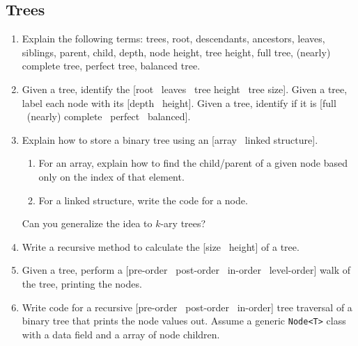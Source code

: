 \documentclass[10pt]{article}
\begin{document}
\subsection{Trees}
\begin{enumerate}[leftmargin=0em]\addtocounter{enumi}{25}
\item Explain the following terms: trees, root, descendants, ancestors, leaves, siblings, parent, child, depth, node height, tree height, full tree, (nearly) complete tree, perfect tree, balanced tree.
\item Given a tree, identify the [root \vline\ leaves \vline\ tree height \vline\ tree size]. Given a tree, label each node with its [depth \vline\ height]. Given a tree, identify if it is [full \vline\ (nearly) complete \vline\ perfect \vline\ balanced].
\item Explain how to store a binary tree using an [array \vline\ linked structure]. 
\begin{enumerate}
    \item For an array, explain how to find the child/parent of a given node based only on the index of that element.
    \item For a linked structure, write the code for a node.
\end{enumerate} 
Can you generalize the idea to $k$-ary trees?
\item Write a recursive method to calculate the [size \vline\ height] of a tree.
\item Given a tree, perform a [pre-order \vline\ post-order \vline\ in-order \vline\ level-order] walk of the tree, printing
the nodes.
\item Write code for a recursive [pre-order \vline\ post-order \vline\ in-order] tree traversal of a binary tree that prints the node values out. Assume a generic \texttt{Node<T>} class with a data field and a array of node children.
\end{enumerate}
\end{document}
